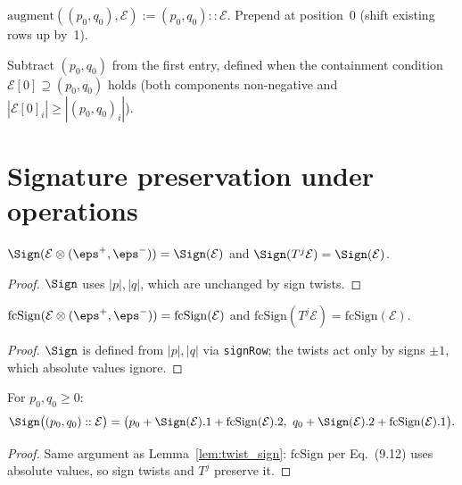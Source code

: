 \begin{definition}
  \label{def:augment}
  \leanok
  $\mathrm{augment}((p_0, q_0), \mathcal{E}) := (p_0, q_0) :: \mathcal{E}$.
  Prepend at position~0 (shift existing rows up by~1).
\end{definition}

\begin{definition}
  \label{def:truncate}
  \leanok
  Subtract $(p_0, q_0)$ from the first entry, defined when the containment condition
  $\mathcal{E}[0] \supseteq (p_0, q_0)$ holds (both components non-negative and
  $|\mathcal{E}[0]_i| \geq |(p_0, q_0)_i|$).
\end{definition}

\section{Signature preservation under operations}

\begin{lemma}
  \label{lem:twist_sign}
  \leanok
  $\Sign(\mathcal{E} \otimes (\eps^+, \eps^-)) = \Sign(\mathcal{E})$ and $\Sign(T^j \mathcal{E}) = \Sign(\mathcal{E})$.
\end{lemma}
\begin{proof}
  \leanok
  $\Sign$ uses $|p|, |q|$, which are unchanged by sign twists.
\end{proof}

\begin{lemma}
  \label{lem:twist_fcSign}
  \leanok
  $\mathrm{fcSign}(\mathcal{E} \otimes (\eps^+, \eps^-)) = \mathrm{fcSign}(\mathcal{E})$ and $\mathrm{fcSign}(T^j \mathcal{E}) = \mathrm{fcSign}(\mathcal{E})$.
\end{lemma}
\begin{proof}
  \leanok
  $\Sign$ is defined from $|p|, |q|$ via \texttt{signRow}; the twists act only by signs $\pm 1$, which absolute values ignore.
\end{proof}


\begin{lemma}
  \label{lem:augment_sign}
  \leanok
  For $p_0, q_0 \geq 0$:
  \[
    \Sign\big((p_0, q_0) :: \mathcal{E}\big) = \big(p_0 + \Sign(\mathcal{E}).1 + \mathrm{fcSign}(\mathcal{E}).2,\ q_0 + \Sign(\mathcal{E}).2 + \mathrm{fcSign}(\mathcal{E}).1\big).
  \]
\end{lemma}
\begin{proof}
  \leanok
  Same argument as Lemma~\ref{lem:twist_sign}: $\mathrm{fcSign}$ per Eq.~(9.12) uses absolute values, so sign twists and $T^j$ preserve it.
\end{proof}


